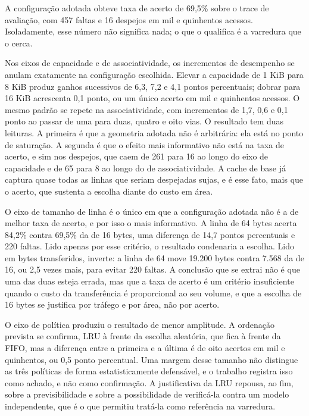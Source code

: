 A configuração adotada obteve taxa de acerto de 69,5\% sobre o trace de avaliação, com 457 faltas e 16 despejos em mil e quinhentos acessos. Isoladamente, esse número não significa nada; o que o qualifica é a varredura que o cerca.

Nos eixos de capacidade e de associatividade, os incrementos de desempenho se anulam exatamente na configuração escolhida. Elevar a capacidade de 1 KiB para 8 KiB produz ganhos sucessivos de 6,3, 7,2 e 4,1 pontos percentuais; dobrar para 16 KiB acrescenta 0,1 ponto, ou um único acerto em mil e quinhentos acessos. O mesmo padrão se repete na associatividade, com incrementos de 1,7, 0,6 e 0,1 ponto ao passar de uma para duas, quatro e oito vias. O resultado tem duas leituras. A primeira é que a geometria adotada não é arbitrária: ela está no ponto de saturação. A segunda é que o efeito mais informativo não está na taxa de acerto, e sim nos despejos, que caem de 261 para 16 ao longo do eixo de capacidade e de 65 para 8 ao longo do de associatividade. A cache de base já captura quase todas as linhas que seriam despejadas sujas, e é esse fato, mais que o acerto, que sustenta a escolha diante do custo em área.

O eixo de tamanho de linha é o único em que a configuração adotada não é a de melhor taxa de acerto, e por isso o mais informativo. A linha de 64 bytes acerta 84,2\% contra 69,5\% da de 16 bytes, uma diferença de 14,7 pontos percentuais e 220 faltas. Lido apenas por esse critério, o resultado condenaria a escolha. Lido em bytes transferidos, inverte: a linha de 64 move 19.200 bytes contra 7.568 da de 16, ou 2,5 vezes mais, para evitar 220 faltas. A conclusão que se extrai não é que uma das duas esteja errada, mas que a taxa de acerto é um critério insuficiente quando o custo da transferência é proporcional ao seu volume, e que a escolha de 16 bytes se justifica por tráfego e por área, não por acerto.

O eixo de política produziu o resultado de menor amplitude. A ordenação prevista se confirma, LRU à frente da escolha aleatória, que fica à frente da FIFO, mas a diferença entre a primeira e a última é de oito acertos em mil e quinhentos, ou 0,5 ponto percentual. Uma margem desse tamanho não distingue as três políticas de forma estatisticamente defensável, e o trabalho registra isso como achado, e não como confirmação. A justificativa da LRU repousa, ao fim, sobre a previsibilidade e sobre a possibilidade de verificá-la contra um modelo independente, que é o que permitiu tratá-la como referência na varredura.

